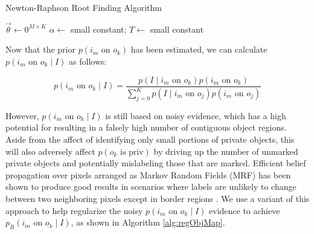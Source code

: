 \documentclass[11pt]{article}
\begin{document}
\begin{algorithm}[h]
\caption{Newton-Raphson Root Finding Algorithm}
	$\vec{\theta} \leftarrow 0^{M \times K}$\;
	$\alpha \leftarrow$ small constant; $T \leftarrow$ small constant\;
\end{algorithm}

Now that the prior $p(i_m \textrm{ on } o_k)$ has been estimated, we can calculate $p(i_m \textrm{ on } o_k \mid I)$ as follows:

$$p(i_m \textrm{ on } o_k \mid I) = 
	\frac{p(I \mid i_m \textrm{ on } o_k) p(i_m \textrm{ on } o_k)}{\sum_{j=0}^{K} p(I \mid i_m \textrm{ on } o_j) p(i_m \textrm{ on } o_j)}$$

However, $p(i_m \textrm{ on } o_k \mid I)$ is still based on noisy evidence, which has a high potential for resulting in a falsely high number of contiguous object regions.  Aside from the affect of identifying only small portions of private objects, this will also adversely affect $p(o_k \textrm{ is priv})$ by driving up the number of unmarked private objects and potentially mislabeling those that are marked.  Efficient belief propagation over pixels arranged as Markov Random Fields (MRF) has been shown to produce good results in scenarios where labels are unlikely to change between two neighboring pixels except in border regions \cite{felzenszwalb2006efficient}.  We use a variant of this approach to help regularize the noisy $p(i_m \textrm{ on } o_k \mid I)$ evidence to achieve $p_R(i_m \textrm{ on } o_k \mid I)$, as shown in Algorithm \ref{alg:regObjMap}.
\end{document}
